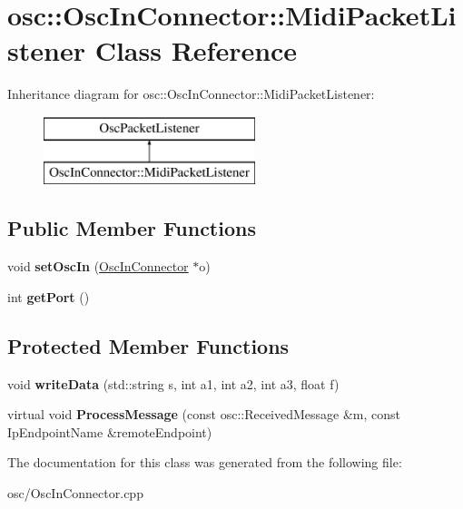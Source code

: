 \hypertarget{classOscInConnector_1_1MidiPacketListener}{\section{osc\-:\-:Osc\-In\-Connector\-:\-:Midi\-Packet\-Listener Class Reference}
\label{classOscInConnector_1_1MidiPacketListener}
}
Inheritance diagram for osc\-:\-:Osc\-In\-Connector\-:\-:Midi\-Packet\-Listener\-:\begin{figure}[H]
\begin{center}
\leavevmode
\includegraphics[height=2.000000cm]{classOscInConnector_1_1MidiPacketListener}
\end{center}
\end{figure}
\subsection*{Public Member Functions}
\begin{DoxyCompactItemize}
\item 
\hypertarget{classOscInConnector_1_1MidiPacketListener_a184cd179631e0405cf51fc9d5787ad68}{void {\bfseries set\-Osc\-In} (\hyperlink{classosc_1_1OscInConnector}{Osc\-In\-Connector} $\ast$o)}\label{classOscInConnector_1_1MidiPacketListener_a184cd179631e0405cf51fc9d5787ad68}

\item 
\hypertarget{classOscInConnector_1_1MidiPacketListener_af32366a75578da1b15ecb54beb7633e5}{int {\bfseries get\-Port} ()}\label{classOscInConnector_1_1MidiPacketListener_af32366a75578da1b15ecb54beb7633e5}

\end{DoxyCompactItemize}
\subsection*{Protected Member Functions}
\begin{DoxyCompactItemize}
\item 
\hypertarget{classOscInConnector_1_1MidiPacketListener_afd16b4451a05a986f23a084d0414b1a4}{void {\bfseries write\-Data} (std\-::string s, int a1, int a2, int a3, float f)}\label{classOscInConnector_1_1MidiPacketListener_afd16b4451a05a986f23a084d0414b1a4}

\item 
\hypertarget{classOscInConnector_1_1MidiPacketListener_a5fa1f1bee930939a8a3a0f127eda5a35}{virtual void {\bfseries Process\-Message} (const osc\-::\-Received\-Message \&m, const Ip\-Endpoint\-Name \&remote\-Endpoint)}\label{classOscInConnector_1_1MidiPacketListener_a5fa1f1bee930939a8a3a0f127eda5a35}

\end{DoxyCompactItemize}


The documentation for this class was generated from the following file\-:\begin{DoxyCompactItemize}
\item 
osc/Osc\-In\-Connector.\-cpp\end{DoxyCompactItemize}
